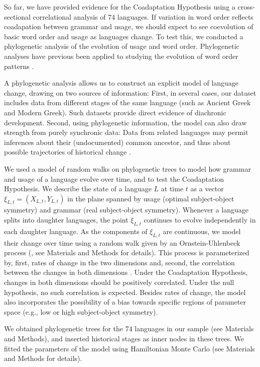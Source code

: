 \documentclass[11pt,a4paper]{article}
\begin{document}
So far, we have provided evidence for the Coadaptation Hypothesis using a cross-sectional correlational analysis of 74 languages.
If variation in word order reflects coadapation between grammar and usage, we should expect to see coevolution of basic word order and usage as languages change.
To test this, we conducted a phylogenetic analysis of the evolution of usage and word order.
Phylogenetic analyses have previous been applied to studying the evolution of word order patterns \citep{dunn-evolved-2011, maurits2014tracing}.

A phylogenetic analysis allows us to construct an explicit model of language change, drawing on two sources of information:
First, in several cases, our dataset includes data from different stages of the same language (such as Ancient Greek and Modern Greek).
Such datasets provide direct evidence of diachronic development.
Second, using phylogenetic information, the model can also draw strength from purely synchronic data:
Data from related languages may permit inferences about their (undocumented) common ancestor, and thus about possible trajectories of historical change \citep{pagel2004bayesian, dunn-evolved-2011, maurits2014tracing}.


We used a model of random walks on phylogenetic trees \citep{felsenstein1973maximum,pagel1997inferring, pagel2004bayesian} to model how grammar and usage of a language evolve over time, and to test the Coadaptation Hypothesis.
We describe the state of a language $L$ at time $t$ as a vector $\xi_{L,t} = (X_{L,t}, Y_{L,t})$ in the plane spanned by usage (optimal subject-object symmetry) and grammar (real subject-object symmetry).
Whenever a language splits into daughter languages, the point $\xi_{L,t}$ continues to evolve independently in each daughter language.
As the components of $\xi_{L,t}$ are continuous, we model their change over time using a random walk given by an Ornstein-Uhlenbeck process (\citep{blackwell2003bayesian}, see Materials and Methods for details).
This process is parameterized by, first, rates of change in the two dimensions and, second, the correlation between the changes in both dimensions \citep{felsenstein1973maximum,freckleton2012fast}.
Under the Coadaptation Hypothesis, changes in both dimensions should be positively correlated.
Under the null hypothesis, no such correlation is expected.
Besides rates of change, the model also incorporates the possibility of a bias towards specific regions of parameter space (e.g., low or high subject-object symmetry).

We obtained phylogenetic trees for the 74 languages in our sample (see Materials and Methods), and inserted historical stages as inner nodes in these trees.
We fitted the parameters of the model using Hamiltonian Monte Carlo (see Materials and Methods for details).
\end{document}
